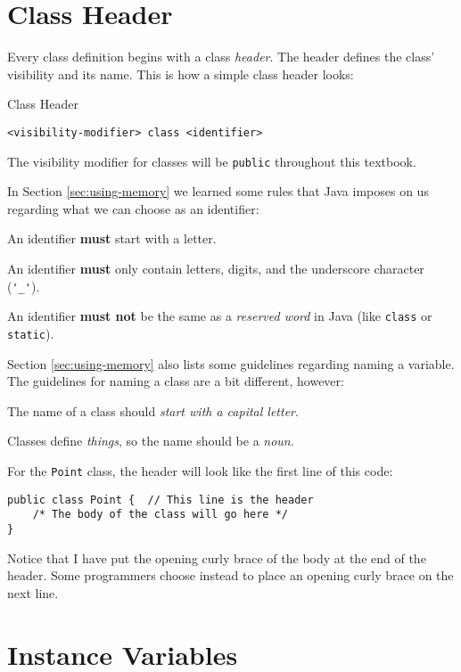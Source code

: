 \section{Class Header}

Every class definition begins with a class \textit{header}.  The header defines the class' visibility and its name.  This is how a simple class header looks:

\begin{javaformat}{Class Header}
\begin{verbatim}
<visibility-modifier> class <identifier>
\end{verbatim}
\end{javaformat}

The visibility modifier for classes will be \texttt{public} throughout this textbook.

In Section \ref{sec:using-memory} we learned some rules that Java imposes on us regarding what we can choose as an identifier:
\bi
\item An identifier \textbf{must} start with a letter.
\item An identifier \textbf{must} only contain letters, digits, and the underscore character (\lstinline{'_'}).
\item An identifier \textbf{must not} be the same as a \textit{reserved word} in Java (like \lstinline{class} or \lstinline{static}).
\ei

Section \ref{sec:using-memory} also lists some guidelines regarding naming a variable.  The guidelines for naming a class are a bit different, however:
\bi
\item The name of a class should \textit{start with a capital letter}.
\item Classes define \textit{things}, so the name should be a \textit{noun}.
\ei

For the \texttt{Point} class, the header will look like the first line of this code:

\begin{verbatim}
public class Point {  // This line is the header
    /* The body of the class will go here */
}
\end{verbatim}

Notice that I have put the opening curly brace of the body at the end of the header.  Some programmers choose instead to place an opening curly brace on the next line.

\section{Instance Variables}

